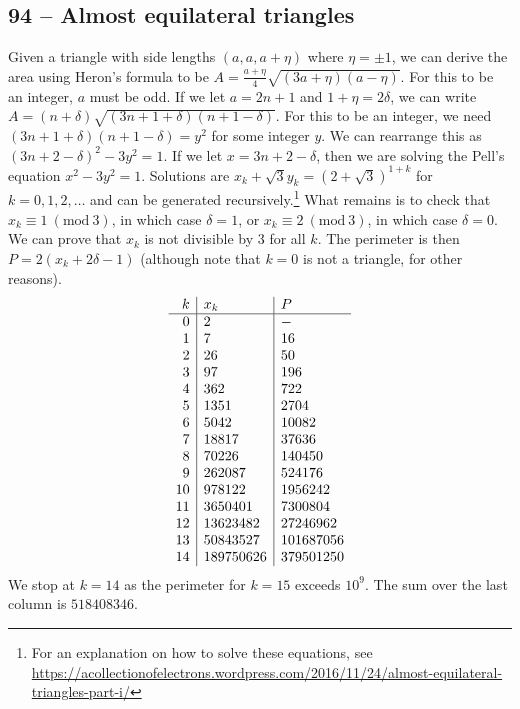 \documentclass{article}
\newcommand{\Mod}[1]{\ (\mathrm{mod}\ #1)}
\begin{document}
\subsection*{94 -- Almost equilateral triangles}
Given a triangle with side lengths $(a, a, a+\eta)$ where $\eta = \pm 1$, we can derive the area using Heron's formula to be $A = \frac{a+\eta}{4}\sqrt{(3a+\eta)(a-\eta)}$.
For this to be an integer, $a$ must be odd.
If we let $a = 2n+1$ and $1 + \eta = 2 \delta$, we can write $A = (n+\delta) \sqrt{ (3n + 1 + \delta)(n + 1 - \delta)}$.
For this to be an integer, we need $(3n + 1 + \delta)(n + 1 - \delta) = y^2$ for some integer $y$.
We can rearrange this as $(3n + 2 - \delta)^2 - 3y^2 = 1$.
If we let $x = 3n + 2 - \delta$, then we are solving the Pell's equation $x^2 - 3y^2 = 1$.
Solutions are $x_k + \sqrt{3} y_k = (2+\sqrt{3})^{1+k}$ for $k = 0, 1, 2, \dotsc$ and can be generated recursively.\footnote{For an explanation on how to solve these equations, see \url{https://acollectionofelectrons.wordpress.com/2016/11/24/almost-equilateral-triangles-part-i/}}
What remains is to check that $x_k \equiv 1 \Mod 3$, in which case $\delta = 1$, or $x_k \equiv 2 \Mod 3$, in which case $\delta = 0$.
We can prove that $x_k$ is not divisible by 3 for all $k$.
The perimeter is then $P = 2(x_k + 2\delta - 1)$ (although note that $k=0$ is not a triangle, for other reasons).
\begin{align*}
	\begin{array}{r | l | l }
	k & x_k & P \\ \hline
	0 & 2 & - \\
	1 & 7 & 16 \\
	2 & 26 & 50 \\
	3 & 97 & 196 \\
	4 & 362 & 722 \\
	5 & 1351 & 2704 \\
	6 & 5042 & 10082 \\
	7 & 18817 & 37636 \\
	8 & 70226 & 140450 \\
	9 & 262087 & 524176 \\
	10 & 978122 & 1956242 \\
	11 & 3650401 & 7300804 \\
	12 & 13623482 & 27246962 \\
	13 & 50843527 & 101687056 \\
	14 & 189750626 & 379501250
	\end{array}
\end{align*}
We stop at $k=14$ as the perimeter for $k=15 $ exceeds $10^9$.
The sum over the last column is $\boxed{518408346}$.
\end{document}
